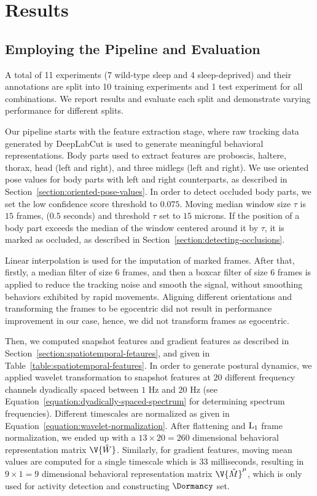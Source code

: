 \setlength{\parindent}{0pt}
\chapter{Results}\label{chapter:results}
\section{Employing the Pipeline and  Evaluation}\label{section:employing-proposed-pipeline}
A total of 11 experiments (7 wild-type sleep and 4 sleep-deprived) and their annotations are split into 10 training experiments and 1 test experiment for all combinations.
We report results and evaluate each split and demonstrate varying performance for different splits.

Our pipeline starts with the feature extraction stage, where raw tracking data generated by DeepLabCut is used to generate meaningful behavioral representations.
Body parts used to extract features are proboscis, haltere, thorax, head (left and right), and three midlegs (left and right).
We use oriented pose values for body parts with left and right counterparts, as described in Section~\ref{section:oriented-pose-values}.
In order to detect occluded body parts, we set the low confidence score threshold to $0.075$.
Moving median window size $\tau$ is $15$ frames, ($0.5$ seconds) and threshold $\tau$ set to $15$ microns. If the position of a body part exceeds the median of the window centered around it by $\tau$, it is marked as occluded, as described in Section~\ref{section:detecting-occlusions}.

Linear interpolation is used for the imputation of marked frames.
After that, firstly, a median filter of size $6$ frames, and then a boxcar filter of size $6$ frames is applied to reduce the tracking noise and smooth the signal, without smoothing behaviors exhibited by rapid movements.
Aligning different orientations and transforming the frames to be egocentric did not result in performance improvement in our case, hence, we did not transform frames as egocentric.

Then, we computed snapshot features and gradient features as described in Section~\ref{section:spatiotemporal-fetaures}, and given in Table~\ref{table:spatiotemporal-features}.
In order to generate postural dynamics, we applied wavelet transformation  to snapshot features at $20$ different frequency channels dyadically spaced between $1$ Hz and $20$ Hz (see Equation~\ref{equation:dyadically-spaced-spectrum} for determining spectrum frequencies).  Different timescales are normalized as given in Equation~\ref{equation:wavelet-normalization}.
After flattening and $\textnormal{L}_1$ frame normalization, we ended up with a $13 \times 20 = 260$ dimensional behavioral representation matrix $\V{\hat{W}}$.
Similarly, for gradient features, moving mean values are computed for a single timescale which is $33$ milliseconds, resulting in $9 \times 1 = 9$ dimensional behavioral representation matrix $\V{\hat{M}}^\mu$, which is only used for activity detection and constructing $\Dormancy$ set.

